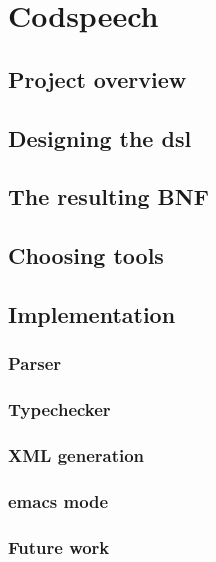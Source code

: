 \chapter{Codspeech}
\lipsum

\section{Project overview}

\section{Designing the dsl}

\section{The resulting BNF}

\section{Choosing tools}

\section{Implementation}

\subsection{Parser}
\subsection{Typechecker}
\subsection{XML generation}
\subsection{emacs mode}

\subsection{Future work}
